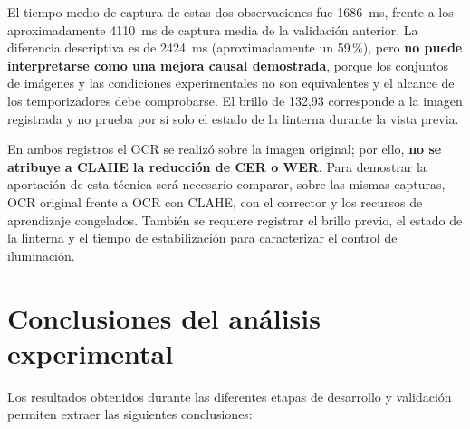 El tiempo medio de captura de estas dos observaciones fue 1686~ms, frente a los aproximadamente 4110~ms de captura media de la validación anterior. La diferencia descriptiva es de 2424~ms (aproximadamente un 59\,\%), pero \textbf{no puede interpretarse como una mejora causal demostrada}, porque los conjuntos de imágenes y las condiciones experimentales no son equivalentes y el alcance de los temporizadores debe comprobarse. El brillo de 132,93 corresponde a la imagen registrada y no prueba por sí solo el estado de la linterna durante la vista previa.

En ambos registros el OCR se realizó sobre la imagen original; por ello, \textbf{no se atribuye a CLAHE la reducción de CER o WER}. Para demostrar la aportación de esta técnica será necesario comparar, sobre las mismas capturas, OCR original frente a OCR con CLAHE, con el corrector y los recursos de aprendizaje congelados. También se requiere registrar el brillo previo, el estado de la linterna y el tiempo de estabilización para caracterizar el control de iluminación.

\section{Conclusiones del análisis experimental}

Los resultados obtenidos durante las diferentes etapas de desarrollo y validación permiten extraer las siguientes conclusiones:

